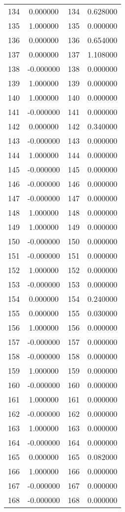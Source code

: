 \documentclass[12pt]{article}
\begin{document}
\begin{longtable}{@{}cccc@{}}
134 & 0.000000 & 134 & 0.628000 \\
135 & 1.000000 & 135 & 0.000000 \\
136 & 0.000000 & 136 & 0.654000 \\
137 & 0.000000 & 137 & 1.108000 \\
138 & -0.000000 & 138 & 0.000000 \\
139 & 1.000000 & 139 & 0.000000 \\
140 & 1.000000 & 140 & 0.000000 \\
141 & -0.000000 & 141 & 0.000000 \\
142 & 0.000000 & 142 & 0.340000 \\
143 & -0.000000 & 143 & 0.000000 \\
144 & 1.000000 & 144 & 0.000000 \\
145 & -0.000000 & 145 & 0.000000 \\
146 & -0.000000 & 146 & 0.000000 \\
147 & -0.000000 & 147 & 0.000000 \\
148 & 1.000000 & 148 & 0.000000 \\
149 & 1.000000 & 149 & 0.000000 \\
150 & -0.000000 & 150 & 0.000000 \\
151 & -0.000000 & 151 & 0.000000 \\
152 & 1.000000 & 152 & 0.000000 \\
153 & -0.000000 & 153 & 0.000000 \\
154 & 0.000000 & 154 & 0.240000 \\
155 & 0.000000 & 155 & 0.030000 \\
156 & 1.000000 & 156 & 0.000000 \\
157 & -0.000000 & 157 & 0.000000 \\
158 & -0.000000 & 158 & 0.000000 \\
159 & 1.000000 & 159 & 0.000000 \\
160 & -0.000000 & 160 & 0.000000 \\
161 & 1.000000 & 161 & 0.000000 \\
162 & -0.000000 & 162 & 0.000000 \\
163 & 1.000000 & 163 & 0.000000 \\
164 & -0.000000 & 164 & 0.000000 \\
165 & 0.000000 & 165 & 0.082000 \\
166 & 1.000000 & 166 & 0.000000 \\
167 & -0.000000 & 167 & 0.000000 \\
168 & -0.000000 & 168 & 0.000000 \\

\end{longtable}
\end{document}
